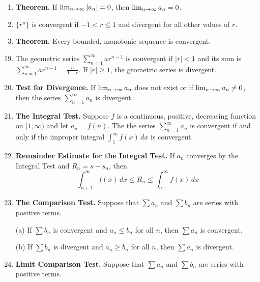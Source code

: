 {\begin{enumerate}
\item {\bf Theorem.} If $\lim_{n\rightarrow\infty}|a_n|=0$, then
$\lim_{n\rightarrow\infty}a_n=0$. 

\item $\{r^n\}$ is convergent if $-1<r\leq 1$ and divergent for all
other values of $r$. 

\item {\bf Theorem.} Every bounded, monotonic sequence is convergent.
\end{enumerate}

\begin{enumerate}
\setcounter{enumi}{18}
\item The geometric series $\sum_{n=1}^{\infty}ar^{n-1}$ is convergent
if $|r|<1$ and its sum is $\sum_{n=1}^{\infty}ar^{n-1}=\frac{a}{1-r}$.
If $|r|\geq 1$, the geometric series is divergent.

\item {\bf Test for Divergence.} If $\lim_{n\rightarrow\infty}a_n$ does not
exist or if $\lim_{n\rightarrow\infty}a_n\neq 0$, then the series
$\sum_{n=1}^{\infty}a_n$ is divergent.
\end{enumerate}

\begin{enumerate}
\setcounter{enumi}{20}
\item {\bf The Integral Test.} Suppose $f$ is a continuous, positive,
decreasing function on $[1,\infty)$ and let $a_n=f(n)$.  The the
series $\sum_{n=1}^{\infty}a_n$ is convergent if and only if the
improper integral $\int_1^{\infty}f(x)\, dx$ is convergent.

\item {\bf Remainder Estimate for the Integral Test.} If $a_n$
converges by the Integral Test and $R_n=s-s_n$, then
\[ \int_{n+1}^{\infty}f(x)\, dx\leq R_n\leq\int_n^{\infty}f(x)\, dx \]
\end{enumerate}

\begin{enumerate}
\setcounter{enumi}{22}
\item {\bf The Comparison Test.} Suppose that $\sum a_n$ and $\sum
b_n$ are series with positive terms.

(a) If $\sum b_n$ is convergent and $a_n\leq b_n$ for all $n$, then
$\sum a_n$ is convergent.

(b) If $\sum b_n$ is divergent and $a_n\geq b_n$ for all $n$, then
$\sum a_n$ is divergent.

\item {\bf Limit Comparison Test.} Suppose that $\sum a_n$ and $\sum
b_n$ are series with positive terms. 


\end{enumerate}}
